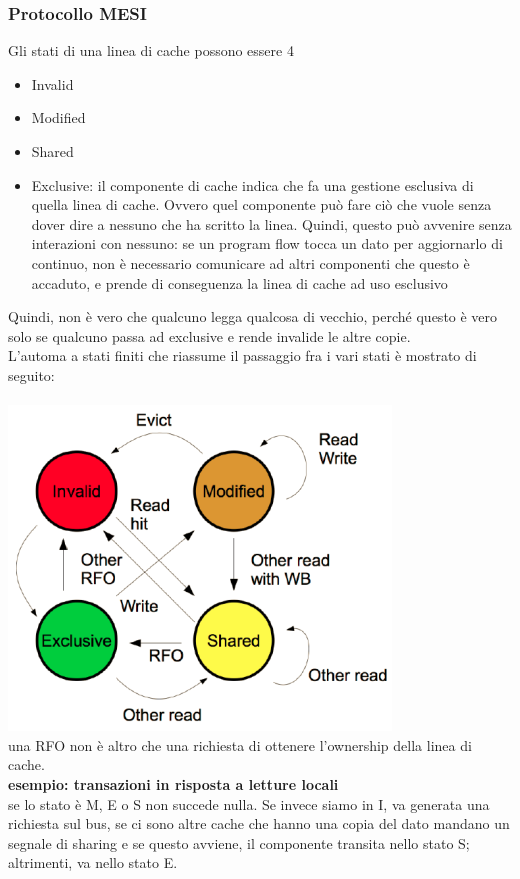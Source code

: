 \documentclass[12pt, oneside]{extbook}
\begin{document}
\subsubsection{Protocollo MESI}
Gli stati di una linea di cache possono essere 4
\begin{itemize}
\item Invalid
\item Modified
\item Shared
\item Exclusive: il componente di cache indica che fa una gestione esclusiva di quella linea di cache. Ovvero quel componente può fare ciò che vuole senza dover dire a nessuno che ha scritto la linea. Quindi, questo può avvenire senza interazioni con nessuno: se un program flow tocca un dato per aggiornarlo di continuo, non è necessario comunicare ad altri componenti che questo è accaduto, e prende di conseguenza la linea di cache ad uso esclusivo
\end{itemize}
Quindi, non è vero che qualcuno legga qualcosa di vecchio, perché questo è vero solo se qualcuno passa ad exclusive e rende invalide le altre copie.\\ L'automa a stati finiti che riassume il passaggio fra i vari stati è mostrato di seguito:\\\\
\includegraphics[scale=0.5]{immagini/MESI}\\
una RFO non è altro che una richiesta di ottenere l'ownership della linea di cache.\\
\textbf{esempio: transazioni in risposta a letture locali}\\
se lo stato è M, E o S non succede nulla. Se invece siamo in I, va generata una richiesta sul bus, se ci sono altre cache che hanno una copia del dato mandano un segnale di sharing e se questo avviene, il componente transita nello stato S; altrimenti, va nello stato E.
\end{document}
